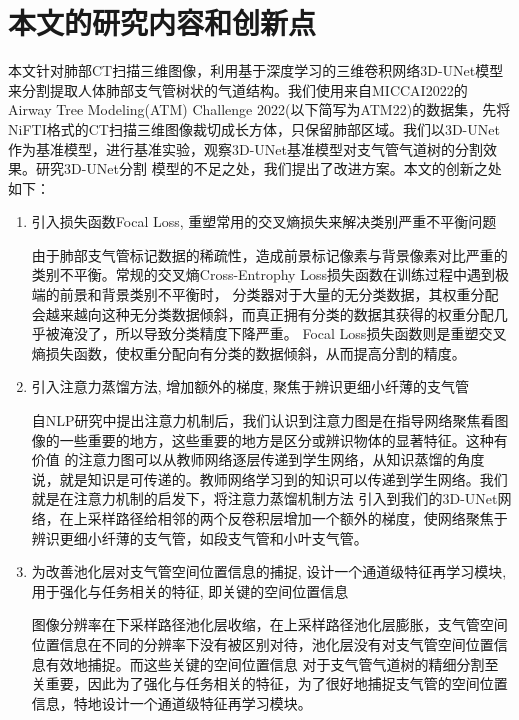 \section{本文的研究内容和创新点}

本文针对肺部CT扫描三维图像，利用基于深度学习的三维卷积网络3D-UNet模型\cite{ronneberger2015u}来分割提取人体肺部支气管树状的气道结构。我们使用来自MICCAI2022的
Airway Tree Modeling(ATM) Challenge 2022(以下简写为ATM22\cite{Zhang2022CFDA, Qin2019AirwayNet, Yu2022Bronchi, Zhang2021Airway})的数据集，先将
NiFTI格式的CT扫描三维图像裁切成长方体，只保留肺部区域。我们以3D-UNet作为基准模型，进行基准实验，观察3D-UNet基准模型对支气管气道树的分割效果。研究3D-UNet分割
模型的不足之处，我们提出了改进方案。本文的创新之处如下：

\begin{enumerate}

\item {\kaishu 引入损失函数Focal Loss, 重塑常用的交叉熵损失来解决类别严重不平衡问题}

由于肺部支气管标记数据的稀疏性，造成前景标记像素与背景像素对比严重的类别不平衡。常规的交叉熵Cross-Entrophy Loss损失函数在训练过程中遇到极端的前景和背景类别不平衡时，
分类器对于大量的无分类数据，其权重分配会越来越向这种无分类数据倾斜，而真正拥有分类的数据其获得的权重分配几乎被淹没了，所以导致分类精度下降严重。
Focal Loss损失函数则是重塑交叉熵损失函数，使权重分配向有分类的数据倾斜，从而提高分割的精度。

\item {\kaishu 引入注意力蒸馏方法, 增加额外的梯度, 聚焦于辨识更细小纤薄的支气管}

自NLP研究中提出注意力机制\cite{NIPS2017Attention}后，我们认识到注意力图是在指导网络聚焦看图像的一些重要的地方，这些重要的地方是区分或辨识物体的显著特征。这种有价值
的注意力图可以从教师网络逐层传递到学生网络，从知识蒸馏的角度说，就是知识是可传递的。教师网络学习到的知识可以传递到学生网络。我们就是在注意力机制的启发下，将注意力蒸馏机制方法
引入到我们的3D-UNet网络，在上采样路径给相邻的两个反卷积层增加一个额外的梯度，使网络聚焦于辨识更细小纤薄的支气管，如段支气管和小叶支气管。

\item {\kaishu 为改善池化层对支气管空间位置信息的捕捉, 设计一个通道级特征再学习模块, 用于强化与任务相关的特征, 即关键的空间位置信息}

图像分辨率在下采样路径池化层收缩，在上采样路径池化层膨胀，支气管空间位置信息在不同的分辨率下没有被区别对待，池化层没有对支气管空间位置信息有效地捕捉。而这些关键的空间位置信息
对于支气管气道树的精细分割至关重要，因此为了强化与任务相关的特征，为了很好地捕捉支气管的空间位置信息，特地设计一个通道级特征再学习模块。

\end{enumerate}


